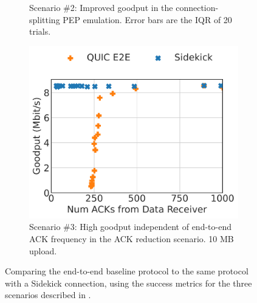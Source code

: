 \begin{figure}
\begin{subfigure}{0.31\textwidth}
\caption{Scenario \#2: Improved goodput in the connection-splitting PEP emulation.
Error bars are the IQR of 20 trials.
}
\label{fig:sidekick:main-results:pep-emulation}
\end{subfigure}
\hfill
\begin{subfigure}{0.32\textwidth}
\includegraphics[width=0.99\linewidth]{sidekick/figures/fig4c_ack_reduction.pdf}
\caption{Scenario \#3:
High goodput independent of end-to-end ACK frequency in the ACK reduction scenario.
10 MB upload.}
\label{fig:sidekick:main-results:ack-reduction}
\end{subfigure}
\caption{
Comparing the end-to-end baseline protocol to the same protocol with a Sidekick
connection, using the success metrics for the three scenarios described in
.
}
\label{fig:sidekick:main-results}
\end{figure}
